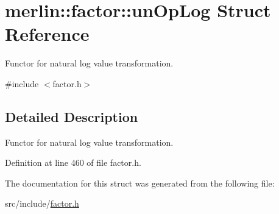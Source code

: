 \hypertarget{structmerlin_1_1factor_1_1unOpLog}{}\section{merlin\+:\+:factor\+:\+:un\+Op\+Log Struct Reference}
\label{structmerlin_1_1factor_1_1unOpLog}


Functor for natural log value transformation.  




{\ttfamily \#include $<$factor.\+h$>$}



\subsection{Detailed Description}
Functor for natural log value transformation. 

Definition at line 460 of file factor.\+h.



The documentation for this struct was generated from the following file\+:\begin{DoxyCompactItemize}
\item 
src/include/\hyperlink{factor_8h}{factor.\+h}\end{DoxyCompactItemize}
